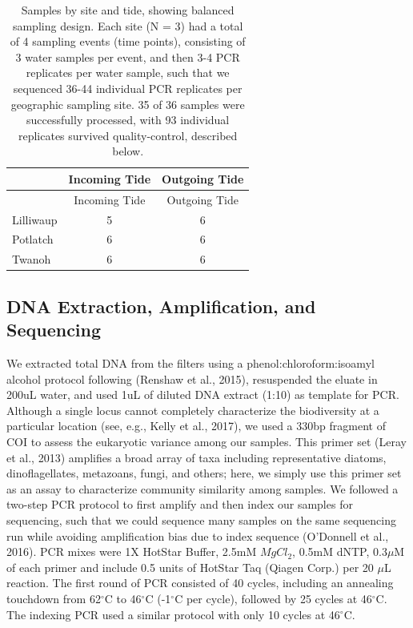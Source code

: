\documentclass[fleqn,10pt,lineno]{wlpeerj} %
\begin{document}
\begin{longtable}[]{@{}lcc@{}}
\caption{Samples by site and tide, showing balanced sampling design.
Each site (N = 3) had a total of 4 sampling events (time points),
consisting of 3 water samples per event, and then 3-4 PCR replicates per
water sample, such that we sequenced 36-44 individual PCR replicates per
geographic sampling site. 35 of 36 samples were successfully processed,
with 93 individual replicates survived quality-control, described
below.}\tabularnewline
\toprule
& Incoming Tide & Outgoing Tide\tabularnewline
\midrule
\endfirsthead
\toprule
& Incoming Tide & Outgoing Tide\tabularnewline
\midrule
\endhead
Lilliwaup & 5 & 6\tabularnewline
Potlatch & 6 & 6\tabularnewline
Twanoh & 6 & 6\tabularnewline
\bottomrule
\end{longtable}

\subsection{DNA Extraction, Amplification, and
Sequencing}\label{dna-extraction-amplification-and-sequencing}

We extracted total DNA from the filters using a
phenol:chloroform:isoamyl alcohol protocol following (Renshaw et al.,
2015), resuspended the eluate in 200uL water, and used 1uL of diluted
DNA extract (1:10) as template for PCR. Although a single locus cannot
completely characterize the biodiversity at a particular location (see,
e.g., Kelly et al., 2017), we used a 330bp fragment of COI to assess the
eukaryotic variance among our samples. This primer set (Leray et al.,
2013) amplifies a broad array of taxa including representative diatoms,
dinoflagellates, metazoans, fungi, and others; here, we simply use this
primer set as an assay to characterize community similarity among
samples. We followed a two-step PCR protocol to first amplify and then
index our samples for sequencing, such that we could sequence many
samples on the same sequencing run while avoiding amplification bias due
to index sequence (O'Donnell et al., 2016). PCR mixes were 1X HotStar
Buffer, 2.5mM \(MgCl_2\), 0.5mM dNTP, 0.3\(\mu\)M of each primer and
include 0.5 units of HotStar Taq (Qiagen Corp.) per 20 \(\mu\)L
reaction. The first round of PCR consisted of 40 cycles, including an
annealing touchdown from 62\(^\circ\)C to 46\(^\circ\)C (-1\(^\circ\)C
per cycle), followed by 25 cycles at 46\(^\circ\)C. The indexing PCR
used a similar protocol with only 10 cycles at 46\(^\circ\)C.
\end{document}
